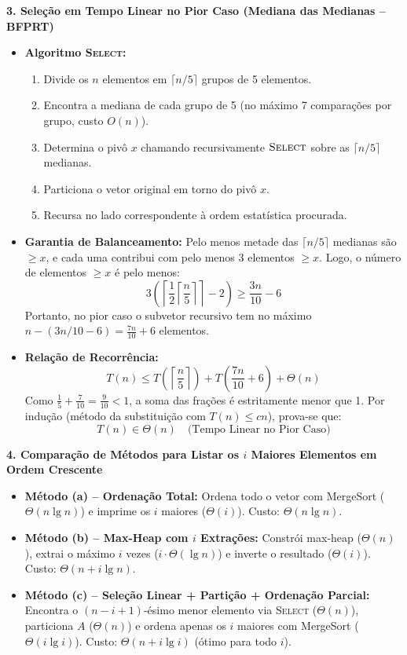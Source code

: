 \documentclass[11pt,a4paper]{article}
\newcommand{\topico}[1]{\par\medskip\textbf{\color{azul}#1}\par}
\begin{document}
\topico{3. Seleção em Tempo Linear no Pior Caso (Mediana das Medianas -- BFPRT)}
\begin{itemize}
  \item \textbf{Algoritmo \textsc{Select}:}
  \begin{enumerate}
    \item Divide os $n$ elementos em $\lceil n/5 \rceil$ grupos de 5 elementos.
    \item Encontra a mediana de cada grupo de 5 (no máximo 7 comparações por grupo, custo $O(n)$).
    \item Determina o pivô $x$ chamando recursivamente $\textsc{Select}$ sobre as $\lceil n/5 \rceil$ medianas.
    \item Particiona o vetor original em torno do pivô $x$.
    \item Recursa no lado correspondente à ordem estatística procurada.
  \end{enumerate}
  \item \textbf{Garantia de Balanceamento:} Pelo menos metade das $\lceil n/5 \rceil$ medianas são $\ge x$, e cada uma contribui com pelo menos 3 elementos $\ge x$. Logo, o número de elementos $\ge x$ é pelo menos:
  \[
  3\left(\left\lceil \frac{1}{2}\left\lceil \frac{n}{5}\right\rceil \right\rceil - 2\right) \ge \frac{3n}{10} - 6
  \]
  Portanto, no pior caso o subvetor recursivo tem no máximo $n - (3n/10 - 6) = \frac{7n}{10} + 6$ elementos.
  \item \textbf{Relação de Recorrência:}
  \[
  T(n) \le T\left(\left\lceil \frac{n}{5}\right\rceil\right) + T\left(\frac{7n}{10} + 6\right) + \Theta(n)
  \]
  Como $\frac{1}{5} + \frac{7}{10} = \frac{9}{10} < 1$, a soma das frações é estritamente menor que 1. Por indução (método da substituição com $T(n) \le cn$), prova-se que:
  \[
  \boxed{T(n) \in \Theta(n) \quad \text{(Tempo Linear no Pior Caso)}}
  \]
\end{itemize}

\topico{4. Comparação de Métodos para Listar os $i$ Maiores Elementos em Ordem Crescente}
\begin{itemize}
  \item \textbf{Método (a) -- Ordenação Total:} Ordena todo o vetor com MergeSort ($\Theta(n \lg n)$) e imprime os $i$ maiores ($\Theta(i)$). Custo: $\Theta(n \lg n)$.
  \item \textbf{Método (b) -- Max-Heap com $i$ Extrações:} Constrói max-heap ($\Theta(n)$), extrai o máximo $i$ vezes ($i \cdot \Theta(\lg n)$) e inverte o resultado ($\Theta(i)$). Custo: $\Theta(n + i \lg n)$.
  \item \textbf{Método (c) -- Seleção Linear + Partição + Ordenação Parcial:} Encontra o $(n-i+1)$-ésimo menor elemento via \textsc{Select} ($\Theta(n)$), particiona $A$ ($\Theta(n)$) e ordena apenas os $i$ maiores com MergeSort ($\Theta(i \lg i)$). Custo: $\Theta(n + i \lg i)$ (ótimo para todo $i$).
\end{itemize}
\end{document}
